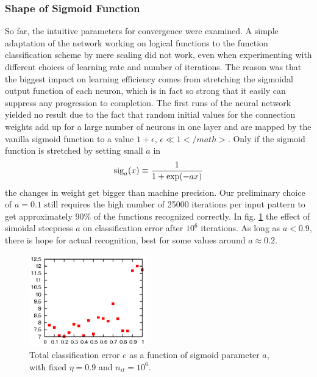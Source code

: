 \documentclass[useAMS,usenatbib]{mn2e}
\begin{document}
\subsubsection{Shape of Sigmoid Function}
%
So far, the intuitive parameters for convergence were examined. A
simple adaptation of the network working on logical functions to the
function classification scheme by mere scaling did not work, even when
experimenting with different choices of learning rate and number of
iterations. The reason was that the biggest impact on learning
efficiency comes from stretching the sigmoidal output function of each
neuron, which is in fact so strong that it easily can suppress any
progression to completion. The first runs of the neural network
yielded no result due to the fact that random initial values for the
connection weights add up for a large number of neurons in one layer
and are mapped by the vanilla sigmoid function to a value
$1+\epsilon$, $\epsilon\ll1</math>$. Only if the sigmoid function is
stretched by setting small $a$ in
%
\begin{equation}
  {\rm sig}_a(x)\equiv\frac{1}{1+\exp(-ax)}
\end{equation}
%
the changes in weight get bigger than machine precision. Our
preliminary choice of $a=0.1$ still requires the high number of 25000
iterations per input pattern to get approximately 90\% of the
functions recognized correctly. In fig. \ref{fig:ea} the effect of
simoidal steepness $a$ on classification error after $10^6$
iterations. As long as $a<0.9$, there is hope for actual recognition,
best for some values around $a\approx0.2$.
\begin{figure}
  \begin{center}
    \includegraphics[width=0.45\textwidth]{fig/err/ea.eps}
  \end{center}
  \caption{\label{fig:ea}Total classification error $e$ as a function of sigmoid parameter $a$, with fixed $\eta=0.9$ and $n_{it}=10^6$.}
\end{figure}
%
\end{document}

